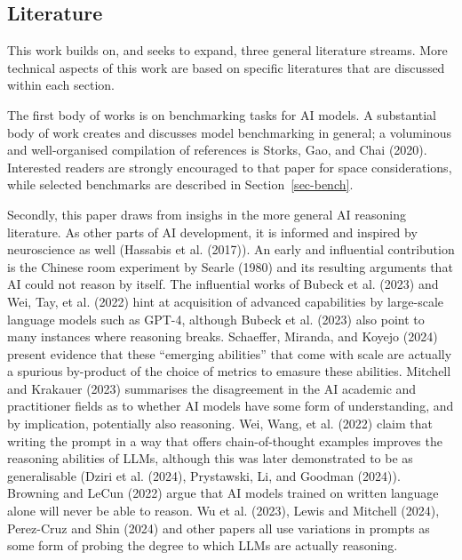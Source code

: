 \documentclass[
]{article}
\theoremstyle{plain}
\theoremstyle{definition}
\theoremstyle{remark}
\begin{document}
\subsection{Literature}\label{literature}

This work builds on, and seeks to expand, three general literature
streams. More technical aspects of this work are based on specific
literatures that are discussed within each section.

The first body of works is on benchmarking tasks for AI models. A
substantial body of work creates and discusses model benchmarking in
general; a voluminous and well-organised compilation of references is
Storks, Gao, and Chai (2020). Interested readers are strongly encouraged
to that paper for space considerations, while selected benchmarks are
described in Section~\ref{sec-bench}.

Secondly, this paper draws from insighs in the more general AI reasoning
literature. As other parts of AI development, it is informed and
inspired by neuroscience as well (Hassabis et al. (2017)). An early and
influential contribution is the Chinese room experiment by Searle (1980)
and its resulting arguments that AI could not reason by itself. The
influential works of Bubeck et al. (2023) and Wei, Tay, et al. (2022)
hint at acquisition of advanced capabilities by large-scale language
models such as GPT-4, although Bubeck et al. (2023) also point to many
instances where reasoning breaks. Schaeffer, Miranda, and Koyejo (2024)
present evidence that these ``emerging abilities'' that come with scale
are actually a spurious by-product of the choice of metrics to emasure
these abilities. Mitchell and Krakauer (2023) summarises the
disagreement in the AI academic and practitioner fields as to whether AI
models have some form of understanding, and by implication, potentially
also reasoning. Wei, Wang, et al. (2022) claim that writing the prompt
in a way that offers chain-of-thought examples improves the reasoning
abilities of LLMs, although this was later demonstrated to be as
generalisable (Dziri et al. (2024), Prystawski, Li, and Goodman (2024)).
Browning and LeCun (2022) argue that AI models trained on written
language alone will never be able to reason. Wu et al. (2023), Lewis and
Mitchell (2024), Perez-Cruz and Shin (2024) and other papers all use
variations in prompts as some form of probing the degree to which LLMs
are actually reasoning.
\end{document}
